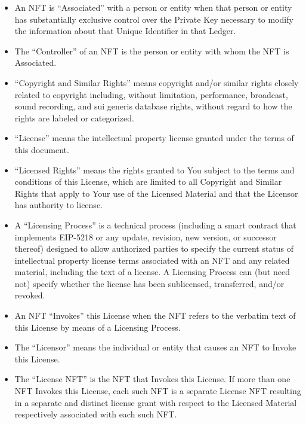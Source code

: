 \documentclass{article}
\newcommand{\eiplicense}{EIP-5218\xspace}
\newcommand{\subsect}[1]{\vspace{12pt}\noindent{\em{#1}}}
\begin{document}
\begin{sffamily}
\begin{itemize}
	\item An NFT  is ``Associated'' with a person or entity when that person or entity has substantially exclusive control over the Private Key necessary to modify the information about that Unique Identifier in that Ledger.
		
	\item The ``Controller'' of an NFT is the person or entity with whom the NFT is Associated.

	\end{itemize}

	\subsect{Licensing}

	\begin{itemize}	
	\item	``Copyright and Similar Rights'' means copyright and/or similar rights closely related to copyright including, without limitation, performance, broadcast, sound recording, and sui generis database rights, without regard to how the rights are labeled or categorized.

	\item	``License'' means the intellectual property license granted under the terms of this document.
		
	\item	``Licensed Rights'' means the rights granted to You subject to the terms and conditions of this License, which are limited to all Copyright and Similar Rights that apply to Your use of the Licensed Material and that the Licensor has authority to license.

	\item	A ``Licensing Process'' is a technical process (including a smart contract that implements \eiplicense or any update, revision, new version, or successor thereof) designed to allow authorized parties to specify the current status of intellectual property license terms associated with an NFT and any related material, including the text of a license. A Licensing Process can (but need not) specify whether the license has been sublicensed, transferred, and/or revoked.

	\item	An NFT ``Invokes'' this License when the NFT refers to the verbatim text of this License by means of a Licensing Process.
		
	\item	The ``Licensor'' means the individual or entity that causes an NFT to Invoke this License.
		
	\item	The ``License NFT'' is the NFT that Invokes this License. If more than one NFT Invokes this License, each such NFT is a separate License NFT resulting in a separate and distinct license grant with respect to the Licensed Material respectively associated with each such NFT.
		

\end{itemize}
\end{sffamily}
\end{document}
